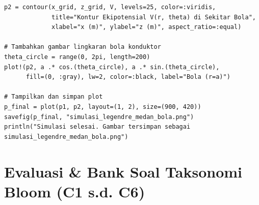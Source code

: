 \documentclass[11pt,a4paper]{article}
\theoremstyle{definition}
\begin{document}
\begin{lstlisting}[caption={Skrip Julia untuk Evaluasi Polinomial Legendre dan Kontur Potensial Bola.}, label={lst:julia_legendre_maxwell}]
p2 = contour(x_grid, z_grid, V, levels=25, color=:viridis,
             title="Kontur Ekipotensial V(r, theta) di Sekitar Bola",
             xlabel="x (m)", ylabel="z (m)", aspect_ratio=:equal)

# Tambahkan gambar lingkaran bola konduktor
theta_circle = range(0, 2pi, length=200)
plot!(p2, a .* cos.(theta_circle), a .* sin.(theta_circle), 
      fill=(0, :gray), lw=2, color=:black, label="Bola (r=a)")

# Tampilkan dan simpan plot
p_final = plot(p1, p2, layout=(1, 2), size=(900, 420))
savefig(p_final, "simulasi_legendre_medan_bola.png")
println("Simulasi selesai. Gambar tersimpan sebagai simulasi_legendre_medan_bola.png")
\end{lstlisting}

\section{Evaluasi \& Bank Soal Taksonomi Bloom (C1 s.d. C6)}
\end{document}
